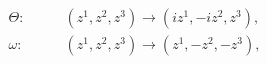 \begin{equation}
\begin{aligned} 
\Theta: \qquad &(z^1,z^2,z^3) \rightarrow (iz^1,-iz^2,z^3),\\  
\omega: \qquad &(z^1,z^2,z^3) \rightarrow (z^1,-z^2,-z^3),
\end{aligned}\nonumber
\end{equation}

